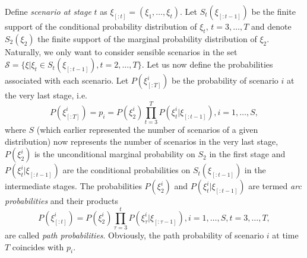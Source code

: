 Define \textit{scenario at stage} $t$ as $\xi_{[:t]} = (\xi_1,\dots,\xi_t)$.
Let $S_t(\xi_{[:t-1]})$ be the finite support of the conditional probability distribution of $\xi_t, \, t=3,\dots,T$ and denote $S_2(\xi_{2})$ the finite support of the marginal probability distribution of $\xi_2$. Naturally, we only want to consider sensible scenarios in the set $\mathcal{S}=\{\xi|\xi_t \in S_t(\xi_{[:t-1]}), t=2,\dots,T\}$. Let us now define the probabilities associated with each scenario. Let $P(\xi_{[:T]}^i)$ be the probability of scenario $i$ at the very last stage, i.e. 
\begin{equation}
P(\xi_{[:T]}^i)=p_i=P(\xi_2^i)\prod_{t=3}^{T}P(\xi_t^i|\xi_{[:t-1]}), i=1,\dots,S,
\end{equation}
where $S$ (which earlier represented the number of scenarios of a given distribution) now represents the number of scenarios in the very last stage, $P(\xi_2^i)$ is the unconditional marginal probability on $S_2$ in the first stage and $P(\xi_t^i|\xi_{[:t-1]})$ are the conditional probabilities on $S_t(\xi_{[:t-1]})$ in the intermediate stages. The probabilities $P(\xi_2^i)$ and $P(\xi_t^i|\xi_{[:t-1]})$ are termed \textit{arc probabilities} and their products 
\begin{equation}
P(\xi_{[:t]}^i)=P(\xi_2^i)\prod_{\tau=3}^{t}P(\xi_\tau^i|\xi_{[:\tau-1]}), i=1,\dots,S, t=3,\dots,T,
\end{equation}
are called \textit{path probabilities}. Obviously, the path probability of scenario $i$ at time $T$ coincides with $p_i$. 	 

